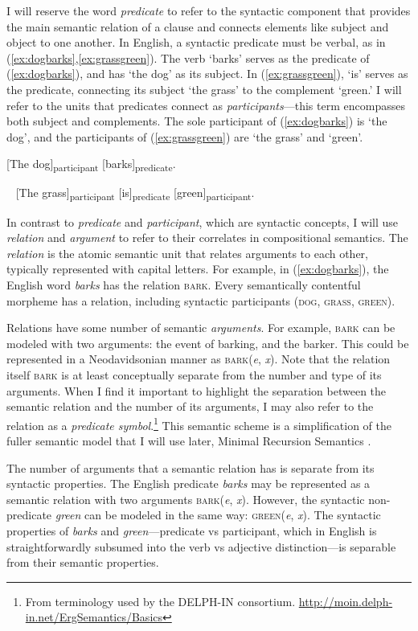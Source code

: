 I will reserve the word \textit{predicate} to refer to the syntactic component that provides the main semantic relation of a clause and connects elements like subject and object to one another. In English, a syntactic predicate must be verbal, as in (\ref{ex:dogbarks},\ref{ex:grassgreen}). The verb `barks' serves as the predicate of (\ref{ex:dogbarks}), and has `the dog' as its subject. In (\ref{ex:grassgreen}), `is' serves as the predicate, connecting its subject `the grass' to the complement `green.' I will refer to the units that predicates connect as \textit{participants}---this term encompasses both subject and complements. The sole participant of (\ref{ex:dogbarks}) is `the dog', and the participants of (\ref{ex:grassgreen}) are `the grass' and `green'.

\ex \label{ex:dogbarks}
[The dog]\textsubscript{participant} [barks]\textsubscript{predicate}.
\xe

\ex~ \label{ex:grassgreen}
[The grass]\textsubscript{participant} [is]\textsubscript{predicate} [green]\textsubscript{participant}.
\xe

In contrast to \textit{predicate} and \textit{participant}, which are syntactic concepts, I will use \textit{relation} and \textit{argument} to refer to their correlates in compositional semantics. The \textit{relation} is the atomic semantic unit that relates arguments to each other, typically represented with capital letters. For example, in (\ref{ex:dogbarks}), the English word \textit{barks} has the relation \textsc{bark}. Every semantically contentful morpheme has a relation, including syntactic participants (\textsc{dog}, \textsc{grass}, \textsc{green}).

Relations have some number of semantic \textit{arguments}. For example, \textsc{bark} can be modeled with two arguments: the event of barking, and the barker. This could be represented in a Neodavidsonian manner as \textsc{bark}(\textit{e}, \textit{x}). Note that the relation itself \textsc{bark} is at least conceptually separate from the number and type of its arguments. When I find it important to highlight the separation between the semantic relation and the number of its arguments, I may also refer to the relation as a \textit{predicate symbol}.\footnote{From terminology used by the DELPH-IN consortium. \url{http://moin.delph-in.net/ErgSemantics/Basics}} This semantic scheme is a simplification of the fuller semantic model that I will use later, Minimal Recursion Semantics \citep{copestake2005}.

The number of arguments that a semantic relation has is separate from its syntactic properties. The English predicate \textit{barks} may be represented as a semantic relation with two arguments \textsc{bark}(\textit{e}, \textit{x}). However, the syntactic non-predicate \textit{green} can be modeled in the same way: \textsc{green}(\textit{e}, \textit{x}). The syntactic properties of \textit{barks} and \textit{green}---predicate vs participant, which in English is straightforwardly subsumed into the verb vs adjective distinction---is separable from their semantic properties.

